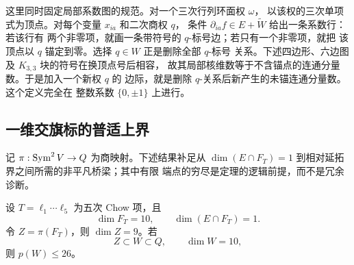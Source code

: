 这里同时固定局部系数图的规范。对一个三次行列环面权 \(\omega\)，
以该权的三次单项式为顶点。对每个变量 \(x_{ia}\) 和二次商权 \(q\)，
条件 \(\partial_{ia}f\in E+\widetilde W\) 给出一条系数行：若该行有
两个非零项，就画一条带符号的 \(q\)-标号边；若只有一个非零项，就把
该顶点以 \(q\) 锚定到零。选择 \(q\in W\) 正是删除全部 \(q\)-标号
关系。下述四边形、六边图及 \(K_{3,3}\) 块的符号在换顶点号后相容，
故其局部核维数等于不含锚点的连通分量数。于是加入一个新权 \(q\) 的
边际，就是删除 \(q\)-关系后新产生的未锚连通分量数。这个定义完全在
整数系数 \(\{0,\pm1\}\) 上进行。

\subsection{一维交旗标的普适上界}

记 \(\pi:\operatorname{Sym}^2V\to Q\) 为商映射。下述结果补足从
\(\dim(E\cap F_T)=1\) 到相对延拓界之间所需的非平凡桥梁；其中有限
端点的穷尽是定理的逻辑前提，而不是冗余诊断。

\begin{theorem}
\label{n5:thm:one-intersection-flag}
设 \(T=\ell_1\cdots\ell_5\) 为五次 Chow 项，且
\[
 \dim F_T=10,\qquad \dim(E\cap F_T)=1.
\]
令 \(Z=\pi(F_T)\)，则 \(\dim Z=9\)。若
\[
 Z\subset W\subset Q,\qquad \dim W=10,
\]
则 \(p(W)\le26\)。
\end{theorem}

